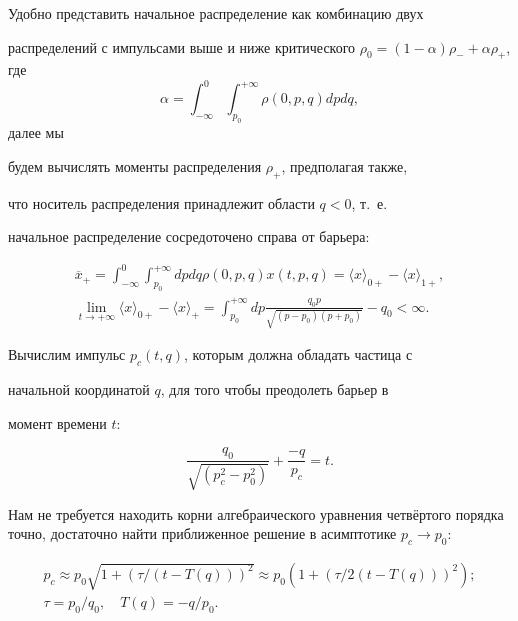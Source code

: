 Удобно представить начальное распределение как комбинацию двух

распределений с  импульсами выше и ниже критического $\rho_0 =(1

-\alpha)\rho_{-}+ \alpha\rho_{+}$, где $$\alpha =

\int_{-\infty}^{0}\int_{p_0}^{+\infty}\rho (0,p,q)dp d q,$$ далее мы

будем вычислять моменты распределения $\rho_{+}$, предполагая также,

что носитель распределения принадлежит области $q<0$,  т.~е.

начальное распределение сосредоточено справа от барьера:

\begin{gather}

\overline{x}_{+}=\int_{-\infty}^{0}\int_{p_0}^{+\infty}dp d q \rho

(0,p,q)x(t,p,q)=\langle x\rangle_{0+} -\langle x\rangle_{1+},

\\

\lim_{t\rightarrow+\infty}\langle x\rangle_{0+}-\langle

x\rangle_{+}=\int_{p_0}^{+\infty}dp\frac{q_0p}{\sqrt{(p-p_0)(p+p_0)}}

-q_0 <\infty.

\end{gather}





Вычислим  импульс $p_c(t,q)$, которым должна обладать частица с

начальной координатой $q$, для того чтобы преодолеть барьер в

момент времени $t$:

$$

\frac{q_0}{\sqrt{(p_c^2-p_0^2)}} +\frac{-q}{p_c}=t.

$$

 Нам не требуется находить корни алгебраического уравнения четвёртого порядка точно, достаточно найти приближенное решение в асимптотике ${p_c\to p_0}$:

\begin{gather}

p_c \approx

p_0\sqrt{1+(\tau/(t-T(q)))^2}\approx p_0 (1+(\tau/2(t-T(q)))^2 );

\\

\tau = p_0/q_0, \quad T(q)= -q/p_0.

\end{gather}





